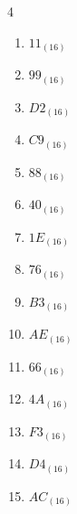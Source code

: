 \begin{multicols}{4}
\begin{enumerate}
  \item $11_{(16)}$

        \phantom{$=17$}

  \item $99_{(16)}$

        \phantom{$=153$}

  \item $D2_{(16)}$

        \phantom{$=210$}

  \item $C9_{(16)}$

        \phantom{$=201$}

  \item $88_{(16)}$

        \phantom{$=136$}

\columnbreak %

\resetques

  \item $40_{(16)}$

        \phantom{$=64$}

  \item $1E_{(16)}$

        \phantom{$=30$}

  \item $76_{(16)}$

        \phantom{$=118$}

  \item $B3_{(16)}$

        \phantom{$=179$}

  \item $AE_{(16)}$

        \phantom{$=174$}

  \item $66_{(16)}$

        \phantom{$=102$}

  \item $4A_{(16)}$

        \phantom{$=74$}

  \item $F3_{(16)}$

        \phantom{$=243$}

  \item $D4_{(16)}$

        \phantom{$=212$}

  \item $AC_{(16)}$

        \phantom{$=172$}


\end{enumerate}
\end{multicols}
